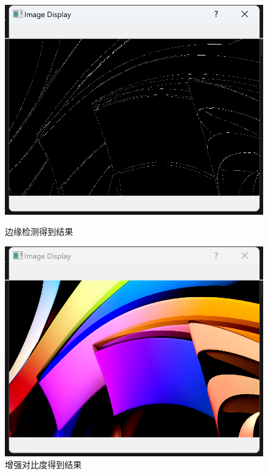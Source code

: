 \documentclass[a4paper,12pt]{article}
\begin{document}
\begin{figure}[htbp]
    \vspace{0.2cm}
    \begin{minipage}[b]{0.48\textwidth}
        \centering
        \includegraphics[width=\linewidth]{images/Design/image_processing/2/detect_edges.png}
        \caption{边缘检测得到结果}
    \end{minipage}
    \hfill
    \begin{minipage}[b]{0.48\textwidth}
        \centering
        \includegraphics[width=\linewidth]{images/Design/image_processing/2/adjust_contrast.png}
        \caption{增强对比度得到结果}
    \end{minipage}
\end{figure}
\end{document}
